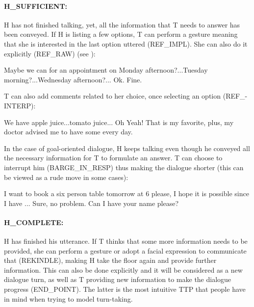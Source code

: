                    	\paragraph{H\_SUFFICIENT:} H has not finished talking, yet, all the information that T needs to answer has been conveyed. If H is listing a few options, T can perform a gesture meaning that she is interested in the last option uttered (REF\_IMPL). She can also do it explicitly (REF\_RAW) (see \cite{El-Asri2014a}):
                    
                    	\begin{dialogue}
							 Maybe we can for an appointment on Monday afternoon?...Tuesday morning?...Wednesday afternoon?...
							 Ok. Fine.
						\end{dialogue}
                        
                   	T can also add comments related to her choice, once selecting an option (REF\_-\\INTERP):
                    
                    	\begin{dialogue}
							 We have apple juice...tomato juice...
							 Oh Yeah! That is my favorite, plus, my doctor advised me to have some every day.
						\end{dialogue}
                    
                    In the case of goal-oriented dialogue, H keeps talking even though he conveyed all the necessary information for T to formulate an answer. T can choose to interrupt him (BARGE\_IN\_RESP) thus making the dialogue shorter (this can be viewed as a rude move in some cases):
                    
                 		\begin{dialogue}
							 I want to book a six person table tomorrow at 6 please, I hope it is possible since I have ...
							 Sure, no problem. Can I have your name please?
						\end{dialogue}
                        
                  	\paragraph{H\_COMPLETE:} H has finished his utterance. If T thinks that some more information needs to be provided, she can perform a gesture or adopt a facial expression to communicate that (REKINDLE), making H take the floor again and provide further information. This can also be done explicitly and it will be considered as a new dialogue turn, as well as T providing new information to make the dialogue progress (END\_POINT). The latter is the most intuitive TTP that people have in mind when trying to model turn-taking.
                    
